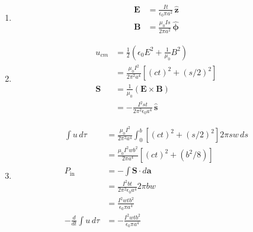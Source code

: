 \documentclass{article}
\renewcommand{\vec}[1]{\boldsymbol{\mathbf{#1}}}
\newcommand{\uvec}[1]{\hat{\vec{#1}}}
\begin{document}
\begin{enumerate}
  \item

        \begin{align*}
          \vec{E} & = \frac{I t}{\epsilon_0 \pi a^2} \,\uvec{z} \\
          \vec{B} & = \frac{\mu_0 I s}{2 \pi a^2} \,\uvec{\phi}
        \end{align*}

  \item

        \begin{align*}
          u_{cm}  & = \frac{1}{2} \left( \epsilon_0 E^2 + \frac{1}{\mu_0} B^2 \right) \\
                  & = \frac{\mu_0 I^2}{2 \pi^2 a^4} [(c t)^2 + (s / 2)^2]             \\
          \vec{S} & = \frac{1}{\mu_0} (\vec{E} \times \vec{B})                        \\
                  & = -\frac{I^2 s t}{2 \pi^2 \epsilon_0 a^4} \,\uvec{s}
        \end{align*}

  \item

        \begin{align*}
          \int u \,d \tau                & = \frac{\mu_0 I^2}{2 \pi^2 a^4} \int_0^b [(c t)^2 + (s / 2)^2] 2 \pi s w \,d s \\
                                         & = \frac{\mu_0 I^2 w b^2}{2 \pi a^4} [(c t)^2 + (b^2 / 8)]                      \\
          P_\text{in}                    & = -\int \vec{S} \cdot d \vec{a}                                                \\
                                         & = \frac{I^2 b t}{2 \pi^2 \epsilon_0 a^4} 2 \pi b w                             \\
                                         & = \frac{I^2 w t b^2}{\epsilon_0 \pi a^4}                                       \\
          -\frac{d}{d t} \int u \,d \tau & = -\frac{I^2 w t b^2}{\epsilon_0 \pi a^4}
        \end{align*}
\end{enumerate}

\setcounter{subsection}{4}
\subsection{}
\end{document}

